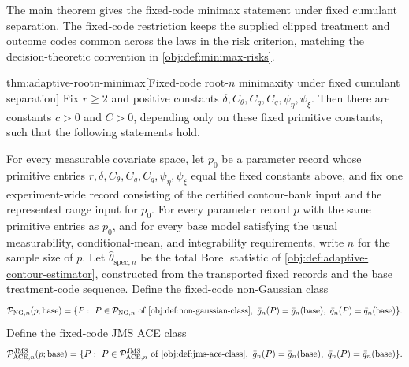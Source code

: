 \documentclass[11pt]{article}
\begin{document}
The main theorem gives the fixed-code minimax statement under fixed cumulant separation. The fixed-code restriction keeps the supplied clipped treatment and outcome codes common across the laws in the risk criterion, matching the decision-theoretic convention in \cref{obj:def:minimax-risks}.

\begin{theoremv}{thm:adaptive-rootn-minimax}[Fixed-code root-\(n\) minimaxity under fixed cumulant separation]
Fix \(r\ge 2\) and positive constants \(\delta,C_{\theta},C_g,C_q,\psi_{\eta},\psi_{\xi}\).  Then there are constants \(c>0\) and \(C>0\), depending only on these fixed primitive constants, such that the following statements hold.

For every measurable covariate space, let \(p_0\) be a parameter record whose primitive entries \(r,\delta,C_{\theta},C_g,C_q,\psi_{\eta},\psi_{\xi}\) equal the fixed constants above, and fix one experiment-wide record consisting of the certified contour-bank input and the represented range input for \(p_0\).  For every parameter record \(p\) with the same primitive entries as \(p_0\), and for every base model satisfying the usual measurability, conditional-mean, and integrability requirements, write \(n\) for the sample size of \(p\).  Let \(\widehat\theta_{\mathrm{spec},n}\) be the total Borel statistic of \cref{obj:def:adaptive-contour-estimator}, constructed from the transported fixed records and the base treatment-code sequence.  Define the fixed-code non-Gaussian class
\[
\mathcal P_{\mathrm{NG},n}(p;\mathrm{base})
=
\{P:\ P\in\mathcal P_{\mathrm{NG},n}\text{ of }\cref{obj:def:non-gaussian-class},\ 
\bar g_n(P)=\bar g_n(\mathrm{base}),\ 
\bar q_n(P)=\bar q_n(\mathrm{base})\}.
\]
Define the fixed-code JMS ACE class
\[
\mathcal P_{\mathrm{ACE},n}^{\mathrm{JMS}}(p;\mathrm{base})
=
\{P:\ P\in\mathcal P_{\mathrm{ACE},n}^{\mathrm{JMS}}\text{ of }\cref{obj:def:jms-ace-class},\ 
\bar g_n(P)=\bar g_n(\mathrm{base}),\ 
\bar q_n(P)=\bar q_n(\mathrm{base})\}.
\]


\end{theoremv}
\end{document}
